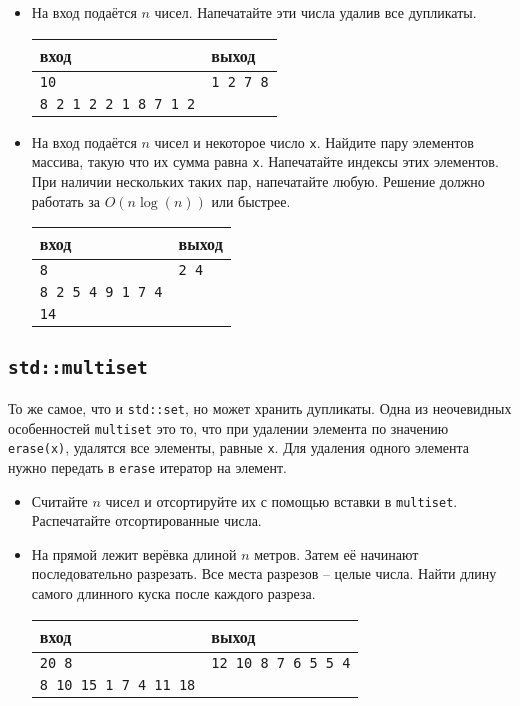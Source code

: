 \documentclass{article}
\begin{document}
\begin{itemize}

\item На вход подаётся $n$ чисел. Напечатайте эти числа удалив все дупликаты.
\begin{center}
\begin{tabular}{ l | l }
 вход & выход \\ \hline
 \texttt{10} & \texttt{1 2 7 8}  \\ 
 \texttt{8 2 1 2 2 1 8 7 1 2} &  \\
\end{tabular}
\end{center}


\item На вход подаётся $n$ чисел и некоторое число \texttt{x}. Найдите пару элементов массива, такую что их сумма равна \texttt{x}. Напечатайте индексы этих элементов. При наличии нескольких таких пар, напечатайте любую. Решение должно работать за $O(n \log(n))$ или быстрее.
\begin{center}
\begin{tabular}{ l | l }
 вход & выход \\ \hline
 \texttt{8} & \texttt{2 4}  \\ 
 \texttt{8 2 5 4 9 1 7 4} &  \\
 \texttt{14} &  \\
\end{tabular}
\end{center}
\end{itemize}


\subsection*{\texttt{std::multiset}}
То же самое, что и \texttt{std::set}, но может хранить дупликаты. Одна из неочевидных особенностей \texttt{multiset} это то, что при удалении элемента по значению \texttt{erase(x)}, удалятся все элементы, равные \texttt{x}. Для удаления одного элемента нужно передать в \texttt{erase} итератор на элемент.
\begin{itemize}
\item Считайте $n$ чисел и отсортируйте их с помощью вставки в \texttt{multiset}. Распечатайте отсортированные числа.
\item На прямой лежит верёвка длиной $n$ метров. Затем её начинают последовательно разрезать. Все места разрезов -- целые числа. Найти длину самого длинного куска после каждого разреза.
\begin{center}
\begin{tabular}{ l | l }
 вход & выход \\ \hline
 \texttt{20 8} & \texttt{12 10 8 7 6 5 5 4}  \\ 
 \texttt{8 10 15 1 7 4 11 18} &  \\
\end{tabular}
\end{center}
\end{itemize}
\end{document}
